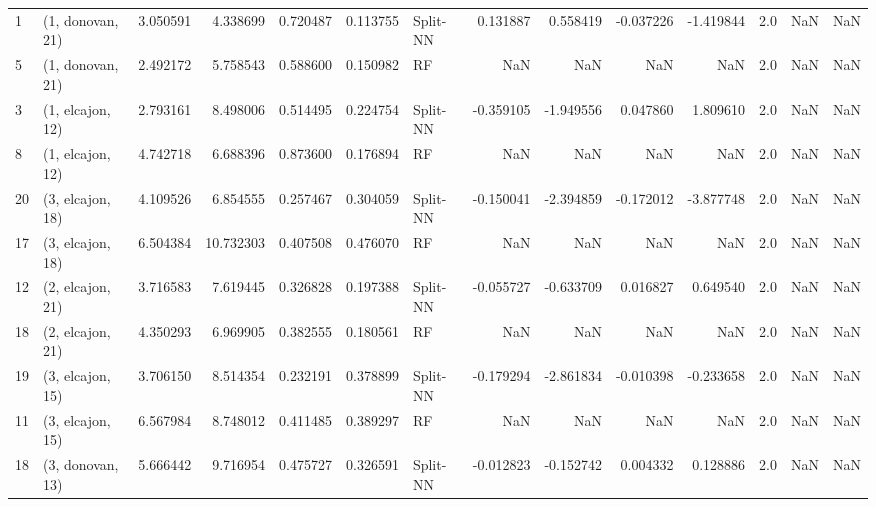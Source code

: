 \begin{tabular}{llrrrrlrrrrrrl}
1  &  (1, donovan, 21) &   3.050591 &   4.338699 &   0.720487 &  0.113755 &    Split-NN &        0.131887 &      0.558419 &      -0.037226 &    -1.419844 &            2.0 &    NaN &              NaN \\
5  &  (1, donovan, 21) &   2.492172 &   5.758543 &   0.588600 &  0.150982 &          RF &             NaN &           NaN &            NaN &          NaN &            2.0 &    NaN &              NaN \\
3  &  (1, elcajon, 12) &   2.793161 &   8.498006 &   0.514495 &  0.224754 &    Split-NN &       -0.359105 &     -1.949556 &       0.047860 &     1.809610 &            2.0 &    NaN &              NaN \\
8  &  (1, elcajon, 12) &   4.742718 &   6.688396 &   0.873600 &  0.176894 &          RF &             NaN &           NaN &            NaN &          NaN &            2.0 &    NaN &              NaN \\
20 &  (3, elcajon, 18) &   4.109526 &   6.854555 &   0.257467 &  0.304059 &    Split-NN &       -0.150041 &     -2.394859 &      -0.172012 &    -3.877748 &            2.0 &    NaN &              NaN \\
17 &  (3, elcajon, 18) &   6.504384 &  10.732303 &   0.407508 &  0.476070 &          RF &             NaN &           NaN &            NaN &          NaN &            2.0 &    NaN &              NaN \\
12 &  (2, elcajon, 21) &   3.716583 &   7.619445 &   0.326828 &  0.197388 &    Split-NN &       -0.055727 &     -0.633709 &       0.016827 &     0.649540 &            2.0 &    NaN &              NaN \\
18 &  (2, elcajon, 21) &   4.350293 &   6.969905 &   0.382555 &  0.180561 &          RF &             NaN &           NaN &            NaN &          NaN &            2.0 &    NaN &              NaN \\
19 &  (3, elcajon, 15) &   3.706150 &   8.514354 &   0.232191 &  0.378899 &    Split-NN &       -0.179294 &     -2.861834 &      -0.010398 &    -0.233658 &            2.0 &    NaN &              NaN \\
11 &  (3, elcajon, 15) &   6.567984 &   8.748012 &   0.411485 &  0.389297 &          RF &             NaN &           NaN &            NaN &          NaN &            2.0 &    NaN &              NaN \\
18 &  (3, donovan, 13) &   5.666442 &   9.716954 &   0.475727 &  0.326591 &    Split-NN &       -0.012823 &     -0.152742 &       0.004332 &     0.128886 &            2.0 &    NaN &              NaN \\

\end{tabular}
